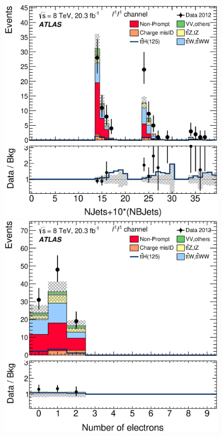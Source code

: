 \begin{figure}[!htbp]
\begin{minipage}[h]{0.4\textwidth}
  \end{minipage}\hfill
  \begin{minipage}[h]{0.4\textwidth}
    \centering \includegraphics[width=\textwidth]{figs/results/results_new/2lep_SR_NJetCombined}
  \end{minipage}\hfill
  \begin{minipage}[h]{0.4\textwidth}
    \centering \includegraphics[width=\textwidth]{figs/results/results_new/2lep_SR_NElec}

\end{minipage}
\end{figure}

